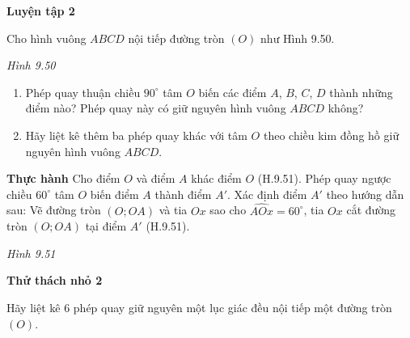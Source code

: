 \begin{lesson}
    \textbf{Luyện tập 2}

    Cho hình vuông $ABCD$ nội tiếp đường tròn $(O)$ như Hình 9.50.

    \begin{center}

        \textit{Hình 9.50}
    \end{center}

    \begin{enumerate}[label=\alph*)]
        \item Phép quay thuận chiều $90^\circ$ tâm $O$ biến các điểm $A$, $B$, $C$, $D$ thành những điểm nào? Phép quay này có giữ nguyên hình vuông $ABCD$ không?
        \item Hãy liệt kê thêm ba phép quay khác với tâm $O$ theo chiều kim đồng hồ giữ nguyên hình vuông $ABCD$.
    \end{enumerate}

    \answerline
    \answerline

    \textbf{Thực hành} Cho điểm $O$ và điểm $A$ khác điểm $O$ (H.9.51). Phép quay ngược chiều $60^\circ$ tâm $O$ biến điểm $A$ thành điểm $A'$. Xác định điểm $A'$ theo hướng dẫn sau: Vẽ đường tròn $(O;OA)$ và tia $Ox$ sao cho $\widehat{AOx}=60^\circ$, tia $Ox$ cắt đường tròn $(O;OA)$ tại điểm $A'$ (H.9.51).

    \begin{center}

        \textit{Hình 9.51}
    \end{center}

    \answerline

    \textbf{Thử thách nhỏ 2}

    Hãy liệt kê 6 phép quay giữ nguyên một lục giác đều nội tiếp một đường tròn $(O)$.

    \answerline
\end{lesson}
